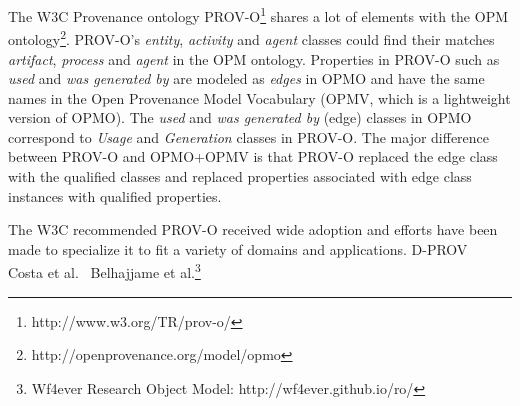 The W3C Provenance ontology PROV-O\footnote{http://www.w3.org/TR/prov-o/} shares a lot of elements with the OPM ontology\footnote{http://openprovenance.org/model/opmo}. PROV-O's \emph{entity}, \emph{activity} and \emph{agent} classes could find their matches \emph{artifact}, \emph{process} and \emph{agent} in the OPM ontology. Properties in PROV-O such as \emph{used} and \emph{was generated by} are modeled as \emph{edges} in OPMO and have the same names in the Open Provenance Model Vocabulary (OPMV, which is a lightweight version of OPMO). The \emph{used} and \emph{was generated by} (edge) classes in OPMO correspond to \emph{Usage} and \emph{Generation} classes in PROV-O. The major difference between PROV-O and OPMO+OPMV is that PROV-O replaced the edge class with the qualified classes and replaced properties associated with edge class instances with qualified properties. 

The W3C recommended PROV-O received wide adoption and efforts have been made to specialize it to fit a variety of domains and applications. D-PROV~\cite{missier2013d}
Costa et al.~\cite{costa2013capturing}
Belhajjame et al.\footnote{Wf4ever Research Object Model: http://wf4ever.github.io/ro/}

